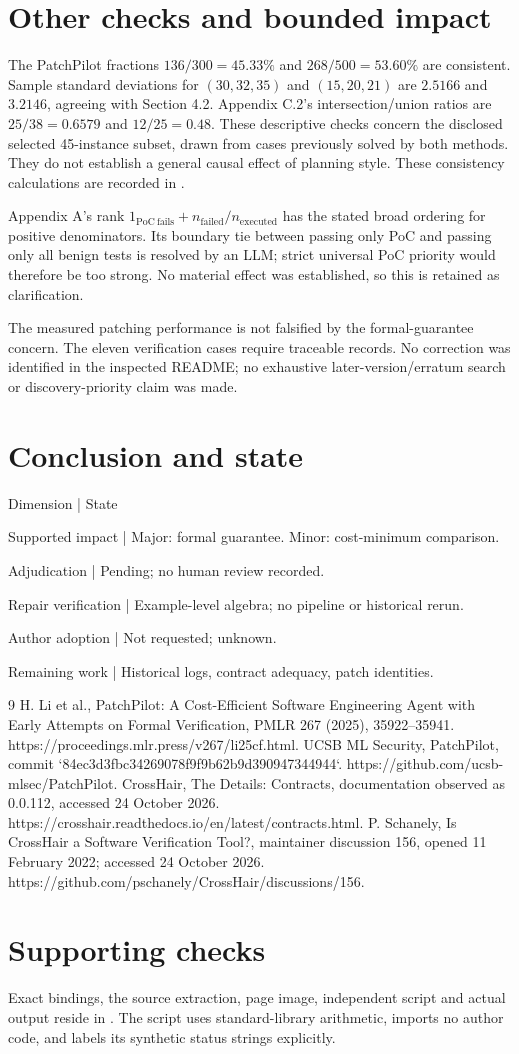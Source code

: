 \documentclass[10pt]{article}
\begin{document}
\section*{Other checks and bounded impact}
The PatchPilot fractions \(136/300=45.33\%\) and \(268/500=53.60\%\) are consistent. Sample standard deviations for \((30,32,35)\) and \((15,20,21)\) are \(2.5166\) and \(3.2146\), agreeing with Section 4.2. Appendix C.2’s intersection/union ratios are \(25/38=0.6579\) and \(12/25=0.48\). These descriptive checks concern the disclosed selected 45-instance subset, drawn from cases previously solved by both methods. They do not establish a general causal effect of planning style. These consistency calculations are recorded in .\par
Appendix A’s rank \(1_{\mathrm{PoC\ fails}}+n_{\mathrm{failed}}/n_{\mathrm{executed}}\) has the stated broad ordering for positive denominators. Its boundary tie between passing only PoC and passing only all benign tests is resolved by an LLM; strict universal PoC priority would therefore be too strong. No material effect was established, so this is retained as clarification.\par
The measured patching performance is not falsified by the formal-guarantee concern. The eleven verification cases require traceable records. No correction was identified in the inspected README; no exhaustive later-version/erratum search or discovery-priority claim was made.\par
\section*{Conclusion and state}
Dimension | State\par
Supported impact | Major: formal guarantee. Minor: cost-minimum comparison.\par
Adjudication | Pending; no human review recorded.\par
Repair verification | Example-level algebra; no pipeline or historical rerun.\par
Author adoption | Not requested; unknown.\par
Remaining work | Historical logs, contract adequacy, patch identities.\par
9 H. Li et al., PatchPilot: A Cost-Efficient Software Engineering Agent with Early Attempts on Formal Verification, PMLR 267 (2025), 35922–35941. https://proceedings.mlr.press/v267/li25cf.html. UCSB ML Security, PatchPilot, commit `84ec3d3fbc34269078f9f9b62b9d390947344944`. https://github.com/ucsb-mlsec/PatchPilot. CrossHair, The Details: Contracts, documentation observed as 0.0.112, accessed 24 October 2026. https://crosshair.readthedocs.io/en/latest/contracts.html. P. Schanely, Is CrossHair a Software Verification Tool?, maintainer discussion 156, opened 11 February 2022; accessed 24 October 2026. https://github.com/pschanely/CrossHair/discussions/156.\par
\section*{Supporting checks}
Exact bindings, the source extraction, page image, independent script and actual output reside in . The script uses standard-library arithmetic, imports no author code, and labels its synthetic status strings explicitly.\par
\end{document}
